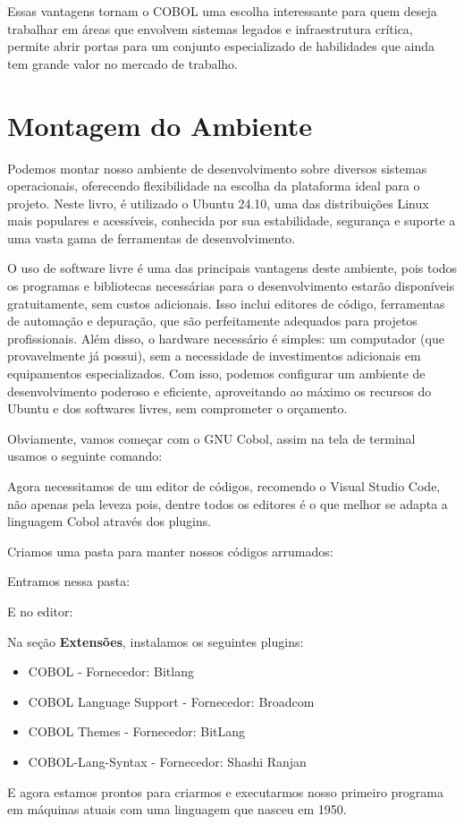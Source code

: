 Essas vantagens tornam o COBOL uma escolha interessante para quem deseja trabalhar em áreas que envolvem sistemas legados e infraestrutura crítica, permite abrir portas para um conjunto especializado de habilidades que ainda tem grande valor no mercado de trabalho.

\section{Montagem do Ambiente}
Podemos montar nosso ambiente de desenvolvimento sobre diversos sistemas operacionais, oferecendo flexibilidade na escolha da plataforma ideal para o projeto. Neste livro, é utilizado o Ubuntu 24.10, uma das distribuições Linux mais populares e acessíveis, conhecida por sua estabilidade, segurança e suporte a uma vasta gama de ferramentas de desenvolvimento.

O uso de software livre é uma das principais vantagens deste ambiente, pois todos os programas e bibliotecas necessárias para o desenvolvimento estarão disponíveis gratuitamente, sem custos adicionais. Isso inclui editores de código, ferramentas de automação e depuração, que são perfeitamente adequados para projetos profissionais. Além disso, o hardware necessário é simples: um computador (que provavelmente já possui), sem a necessidade de investimentos adicionais em equipamentos especializados. Com isso, podemos configurar um ambiente de desenvolvimento poderoso e eficiente, aproveitando ao máximo os recursos do Ubuntu e dos softwares livres, sem comprometer o orçamento.

Obviamente, vamos começar com o GNU Cobol, assim na tela de terminal usamos o seguinte comando: \\

Agora necessitamos de um editor de códigos, recomendo o Visual Studio Code, não apenas pela leveza pois, dentre todos os editores é o que melhor se adapta a linguagem Cobol através dos plugins. \\

Criamos uma pasta para manter nossos códigos arrumados: \\

Entramos nessa pasta: \\

E no editor: \\

Na seção \textbf{Extensões}, instalamos os seguintes plugins:
\begin{itemize}
	\item COBOL - Fornecedor: Bitlang
	\item COBOL Language Support - Fornecedor: Broadcom
	\item COBOL Themes - Fornecedor: BitLang
	\item COBOL-Lang-Syntax - Fornecedor: Shashi Ranjan
\end{itemize}

E agora estamos prontos para criarmos e executarmos nosso primeiro programa em máquinas atuais com uma linguagem que nasceu em 1950.
\clearpage